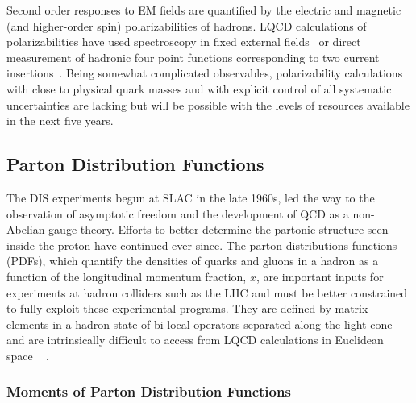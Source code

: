 Second order responses to EM fields are quantified by the electric and magnetic (and higher-order spin) polarizabilities of hadrons. LQCD calculations of polarizabilities have used spectroscopy in fixed external fields~\cite{Detmold:2006vu,Detmold:2009dx,Detmold:2010ts,Freeman:2014kka,Lujan:2014kia,Chang:2015qxa,Lujan:2016ffj,Shanahan:2017bgi,Tiburzi:2017iux,Agadjanov:2016cjc,Agadjanov:2018yxh,Chambers:2015kuw,} or direct measurement of hadronic four point functions corresponding to two current insertions~\cite{Engelhardt:2007ub}. Being somewhat complicated observables, polarizability calculations with close to physical quark masses and with explicit control of all systematic uncertainties are lacking but will be possible with the levels of resources available in the next five years.

\subsection{Parton Distribution Functions}

The DIS experiments begun at SLAC in the late 1960s, led the way to the observation of asymptotic freedom and the development of QCD as a non-Abelian gauge theory. Efforts to better determine the partonic structure seen inside the proton have continued ever since. The parton distributions functions (PDFs), which quantify the densities of quarks and gluons in a hadron as a function of the longitudinal momentum fraction, $x$, are important inputs for experiments at hadron colliders such as the LHC and must be better constrained to fully exploit these experimental programs.
They  are defined by matrix elements in a hadron state of bi-local operators separated along the light-cone and are intrinsically difficult to access from LQCD calculations in Euclidean space ~\cite{Collins:1981uw,Curci:1980uw,Baulieu:1979mr,Collins:1989gx} .


\subsubsection{Moments of Parton Distribution Functions}

